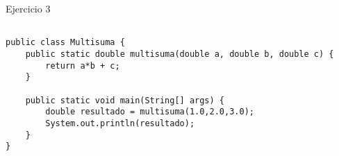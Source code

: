 \documentclass[12pt,letterpaper, onecolumn]{exam}
\begin{document}
\begin{questions}
    \pagebreak %
    
    \question[] Ejercicio 3\droppoints
    
    \begin{solution}
            \begin{verbatim}

public class Multisuma {
    public static double multisuma(double a, double b, double c) {
        return a*b + c;
    }

    public static void main(String[] args) {
        double resultado = multisuma(1.0,2.0,3.0);
        System.out.println(resultado);
    }
}
            \end{verbatim}
    \end{solution}
    
\end{questions}
\end{document}
